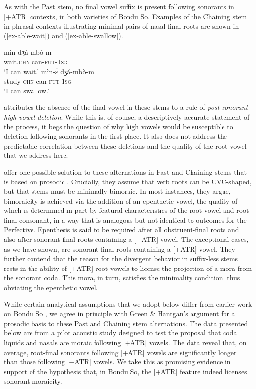 \documentclass[output=paper,colorlinks,citecolor=brown]{langscibook}
\begin{document}
As with the Past stem, no final vowel suffix is present following sonorants in [+ATR] contexts, in both varieties of Bondu So. Examples of the Chaining stem in phrasal contexts illustrating minimal pairs of nasal-final roots are shown in (\ref{ex-able-wait}) and (\ref{ex-able-swallow}).

\begin{multicols}{2}
\ea \label{ex-able-wait}
\gll mìn                           dʒá-mbò-m\\
     wait.\textsc{chn} can-\textsc{fut}-\textsc{1sg}\\
\glt `I can wait.'
\z
\ea \label{ex-able-swallow}
\gll mìn-ɛ́                           dʒá-mbò-m\\
     study-\textsc{chn} can-\textsc{fut}-\textsc{1sg}\\
\glt `I can swallow.'
\z
\end{multicols}

\citet[34]{HeathBS2017} attributes the absence of the final vowel in these stems to a rule of \textit{post-sonorant high vowel deletion}. While this is, of course, a descriptively accurate statement of the process, it begs the question of why high vowels would be susceptible to deletion following sonorants in the first place. It also does not address the predictable correlation between these deletions and the quality of the root vowel that we address here.

\citet{GreenHantgan} offer one possible solution to these alternations in Past and Chaining stems that is based on prosodic . Crucially, they assume that verb roots can be CVC-shaped, but that stems must be minimally bimoraic. In most instances, they argue, bimoraicity is achieved via the addition of an epenthetic vowel, the quality of which is determined in part by featural characteristics of the root vowel and root-final consonant, in a way that is analogous but not identical to outcomes for the Perfective. Epenthesis is said to be required after all obstruent-final roots and also after sonorant-final roots containing a [−ATR] vowel. The exceptional cases, as we have shown, are sonorant-final roots containing a [+ATR] vowel. They further contend that the reason for the divergent behavior in suffix-less stems rests in the ability of [+ATR] root vowels to license the projection of a mora from the sonorant coda. This mora, in turn, satisfies the minimality condition, thus obviating the epenthetic vowel.

While certain analytical assumptions that we adopt below differ from earlier work on Bondu So \citep{GreenHantgan, HantganDavis}, we agree in principle with Green \& Hantgan's argument for a prosodic basis to these Past and Chaining stem alternations. The data presented below are from a pilot acoustic study designed to test the proposal that coda liquids and nasals are moraic following [+ATR] vowels. The data reveal that, on average, root-final sonorants following [+ATR] vowels are significantly longer than those following [−ATR] vowels. We take this as promising evidence in support of the hypothesis that, in Bondu So, the [+ATR] feature indeed  licenses sonorant moraicity.
\end{document}
